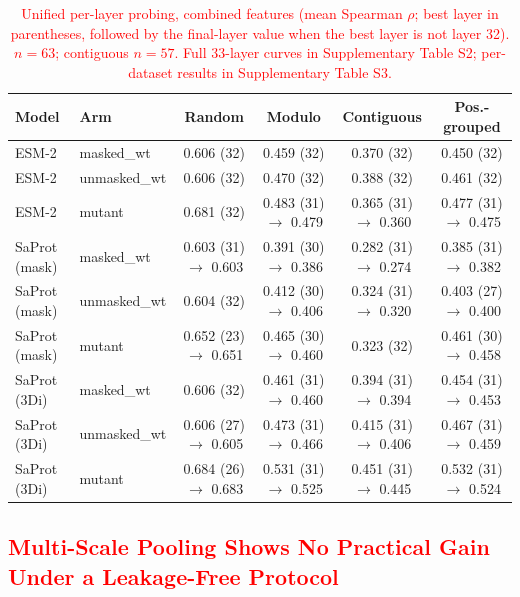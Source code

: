 \documentclass[numbered,webpdf,modern,large]{oup-authoring-template}
\newcommand{\rev}[1]{\textcolor{red}{#1}}
\begin{document}
\begin{table}[ht]
\centering
\caption{\rev{Unified per-layer probing, combined features (mean Spearman
$\rho$; best layer in parentheses, followed by the final-layer value when the best
layer is not layer 32). $n = 63$; contiguous $n = 57$. Full 33-layer curves in
Supplementary Table S2; per-dataset results in Supplementary Table S3.}}
\label{tab:probing}
\begin{tabular}{llcccc}
\toprule
Model & Arm & Random & Modulo & Contiguous & Pos.-grouped \\
\midrule
ESM-2 & masked\_wt   & 0.606 (32) & 0.459 (32) & 0.370 (32) & 0.450 (32) \\
ESM-2 & unmasked\_wt & 0.606 (32) & 0.470 (32) & 0.388 (32) & 0.461 (32) \\
ESM-2 & mutant       & 0.681 (32) & 0.483 (31) $\rightarrow$ 0.479 & 0.365 (31) $\rightarrow$ 0.360 & 0.477 (31) $\rightarrow$ 0.475 \\
\midrule
SaProt (mask) & masked\_wt   & 0.603 (31) $\rightarrow$ 0.603 & 0.391 (30) $\rightarrow$ 0.386 & 0.282 (31) $\rightarrow$ 0.274 & 0.385 (31) $\rightarrow$ 0.382 \\
SaProt (mask) & unmasked\_wt & 0.604 (32) & 0.412 (30) $\rightarrow$ 0.406 & 0.324 (31) $\rightarrow$ 0.320 & 0.403 (27) $\rightarrow$ 0.400 \\
SaProt (mask) & mutant       & 0.652 (23) $\rightarrow$ 0.651 & 0.465 (30) $\rightarrow$ 0.460 & 0.323 (32) & 0.461 (30) $\rightarrow$ 0.458 \\
\midrule
SaProt (3Di) & masked\_wt   & 0.606 (32) & 0.461 (31) $\rightarrow$ 0.460 & 0.394 (31) $\rightarrow$ 0.394 & 0.454 (31) $\rightarrow$ 0.453 \\
SaProt (3Di) & unmasked\_wt & 0.606 (27) $\rightarrow$ 0.605 & 0.473 (31) $\rightarrow$ 0.466 & 0.415 (31) $\rightarrow$ 0.406 & 0.467 (31) $\rightarrow$ 0.459 \\
SaProt (3Di) & mutant       & 0.684 (26) $\rightarrow$ 0.683 & 0.531 (31) $\rightarrow$ 0.525 & 0.451 (31) $\rightarrow$ 0.445 & 0.532 (31) $\rightarrow$ 0.524 \\
\bottomrule
\end{tabular}
\end{table}

\subsection{\rev{Multi-Scale Pooling Shows No Practical Gain Under a Leakage-Free Protocol}}
\end{document}
